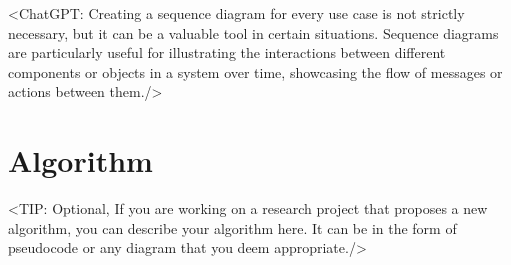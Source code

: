 <ChatGPT: Creating a sequence diagram for every use case is not
strictly necessary, but it can be a valuable tool in certain situations. Sequence
diagrams are particularly useful for illustrating the interactions between different
components or objects in a system over time, showcasing the flow of messages
or actions between them./>

\section{Algorithm}
\label{section:algorithm}
<TIP: Optional, If you are working on a research project that proposes a new
algorithm, you can describe your algorithm here. It can be in the form of
pseudocode or any diagram that you deem appropriate./>